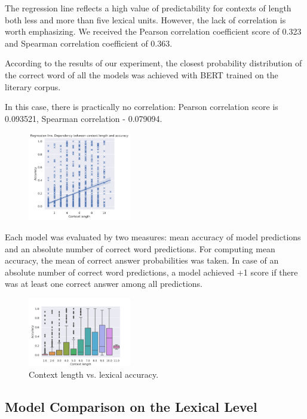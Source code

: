 \documentclass[a4paper]{article}
\begin{document}
The regression line reflects a high value of predictability for contexts of length both less and more than five lexical units. However, the lack of correlation is worth emphasizing. We received the Pearson correlation coefficient score of 0.323 and Spearman correlation coefficient of 0.363.

According to the results of our experiment, the closest probability distribution of the correct word of all the models was achieved with BERT trained on the literary corpus.

In this case, there is practically no correlation: Pearson correlation score is 0.093521, Spearman correlation - 0.079094.

\begin{figure}
\label{fig:context-accuracy-regression}
\centering
\includegraphics[width=0.4\textwidth]{figures/pdf/context-accuracy-regression.pdf}
\end{figure}


Each model was evaluated by two measures: mean accuracy of model predictions and an absolute number of correct word predictions. For computing mean accuracy, the mean of correct answer probabilities was taken. In case of an absolute number of correct word predictions, a model achieved +1 score if there was at least one correct answer among all predictions.

\begin{figure}
\centering
\includegraphics[width=0.4\textwidth]{figures/pdf/context-accuracy-lexical.pdf}
\caption{Context length vs. lexical accuracy.}
\end{figure}

\subsection{Model Comparison on the Lexical Level}
\end{document}

